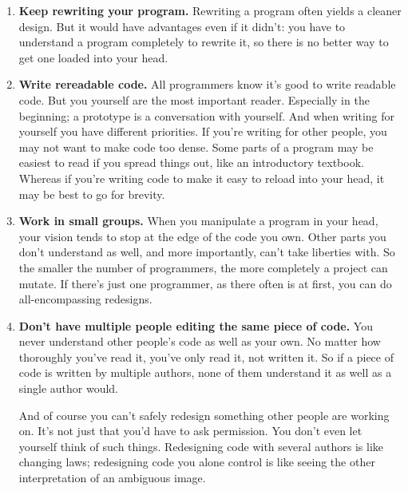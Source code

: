 \documentclass[12pt]{book}
\begin{document}
\begin{enumerate}
  You can magnify the effect of a powerful language by using a style
  called bottom-up programming, where you write programs in multiple
  layers, the lower ones acting as programming languages for those
  above. If you do this right, you only have to keep the topmost layer
  in your head.
\item
  \textbf{Keep rewriting your program.} Rewriting a program often yields
  a cleaner design. But it would have advantages even if it didn't: you
  have to understand a program completely to rewrite it, so there is no
  better way to get one loaded into your head.
\item
  \textbf{Write rereadable code.} All programmers know it's good to
  write readable code. But you yourself are the most important reader.
  Especially in the beginning; a prototype is a conversation with
  yourself. And when writing for yourself you have different priorities.
  If you're writing for other people, you may not want to make code too
  dense. Some parts of a program may be easiest to read if you spread
  things out, like an introductory textbook. Whereas if you're writing
  code to make it easy to reload into your head, it may be best to go
  for brevity.
\item
  \textbf{Work in small groups.} When you manipulate a program in your
  head, your vision tends to stop at the edge of the code you own. Other
  parts you don't understand as well, and more importantly, can't take
  liberties with. So the smaller the number of programmers, the more
  completely a project can mutate. If there's just one programmer, as
  there often is at first, you can do all-encompassing redesigns.
\item
  \textbf{Don't have multiple people editing the same piece of code.}
  You never understand other people's code as well as your own. No
  matter how thoroughly you've read it, you've only read it, not written
  it. So if a piece of code is written by multiple authors, none of them
  understand it as well as a single author would.

  And of course you can't safely redesign something other people are
  working on. It's not just that you'd have to ask permission. You don't
  even let yourself think of such things. Redesigning code with several
  authors is like changing laws; redesigning code you alone control is
  like seeing the other interpretation of an ambiguous image.


\end{enumerate}
\end{document}
